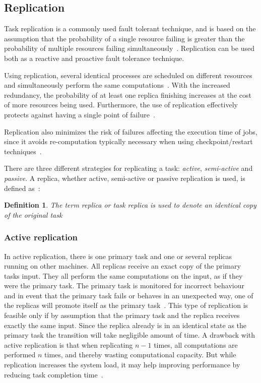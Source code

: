 \documentclass{cslthse-msc}
\newtheorem{definition}{Definition}[chapter]
\begin{document}
\subsection{Replication} \label{subsec:background_replication}
Task replication is a commonly used fault tolerant technique, and is based on the assumption that the probability of a single resource failing is greater than the probability of multiple resources failing simultaneously~\cite{faultToleranceGrid}. Replication can be used both as a reactive and proactive fault tolerance technique.

Using replication, several identical processes are scheduled on different resources and simultaneously perform the same computations~\cite{relGridSystems}. With the increased redundancy, the probability of at least one replica finishing increases at the cost of more resources being used. Furthermore, the use of replication effectively protects against having a single point of failure~\cite{faultToleranceGrid}.

Replication also minimizes the risk of failures affecting the execution time of jobs, since it avoids re-computation typically necessary when using checkpoint/restart techniques~\cite{designFaultTolerantSched}.

There are three different strategies for replicating a task: \emph{active}, \emph{semi-active} and \emph{passive}. A replica, whether active, semi-active or passive replication is used, is defined as~\cite{effTaskReplMobGrid}:
\begin{definition} \label{def:replica}
The term replica or task replica is used to denote an identical copy of the original task
\end{definition}

\subsubsection{Active replication} \label{subsec:active_replication}
In active replication, there is one primary task and one or several replicas running on other machines. All replicas receive an exact copy of the primary tasks input. They all perform the same computations on the input, as if they were the primary task. The primary task is monitored for incorrect behaviour and in event that the primary task fails or behaves in an unexpected way, one of the replicas will promote itself as the primary task~\cite{surveyFaultParallel}. This type of replication is feasible only if by assumption that the primary task and the replica receives exactly the same input. Since the replica already is in an identical state as the primary task the transition will take negligible amount of time. A drawback with active replication is that when replicating $n-1$ times, all computations are performed $n$ times, and thereby wasting computational capacity. But while replication increases the system load, it may help improving performance by reducing task completion time~\cite{improvingPerformanceReplication}.
\end{document}
